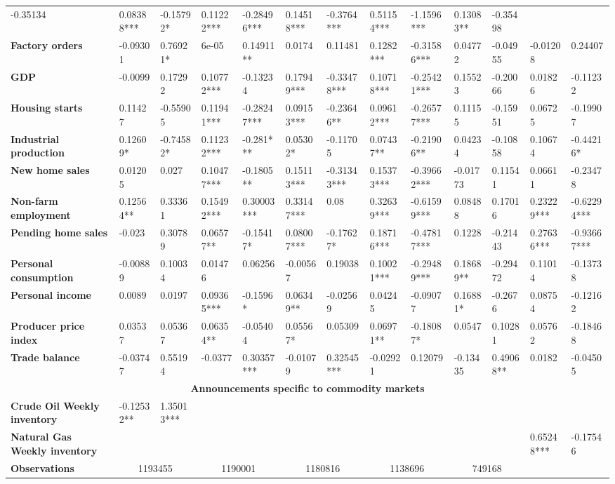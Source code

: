 \begin{sidewaystable}
{\begin{tabular}{@{}lllllllllllll@{}}
-0.35134 & 0.08388*** & -0.15792* & 0.11222*** & -0.28496*** & 0.14518*** & -0.3764*** & 0.51154*** & -1.1596*** & 0.13083** & -0.35498 \\ \textbf{Factory orders}& -0.09301 & 0.76921* & 6e-05 & 0.14911** & 0.0174 & 0.11481 & 0.1282*** & -0.31586*** & 0.04772 & -0.04955 & -0.01208 & 0.24407 \\ \textbf{GDP}& -0.0099 & 0.17292 & 0.10772*** & -0.13234 & 0.17949*** & -0.33478*** & 0.10718*** & -0.25421*** & 0.15523 & -0.20066 & 0.01826 & -0.11232 \\ \textbf{Housing starts}& 0.11427 & -0.55905 & 0.11941*** & -0.28247*** & 0.09153*** & -0.23646** & 0.09612*** & -0.26577*** & 0.11155 & -0.15951 & 0.06725 & -0.19907 \\ \textbf{Industrial production}& 0.12609* & -0.74582* & 0.11232*** & -0.281*** & 0.05302* & -0.11705 & 0.07437** & -0.21906** & 0.04234 & -0.10858 & 0.10674 & -0.44216* \\ \textbf{New home sales}& 0.01205 & 0.027 & 0.10477*** & -0.1805** & 0.15113*** & -0.31343*** & 0.15373*** & -0.39662*** & -0.01773 & 0.11541 & 0.06611 & -0.23478 \\ \textbf{Non-farm employment}& 0.12564** & 0.33361 & 0.15492*** & 0.30003*** & 0.33147*** & 0.08 & 0.32639*** & -0.61599*** & 0.08488 & 0.17016 & 0.23229*** & -0.62294*** \\ \textbf{Pending home sales}& -0.023 & 0.30789 & 0.06577** & -0.15417* & 0.08007*** & -0.17627* & 0.18716*** & -0.47817*** & 0.1228 & -0.21443 & 0.27636*** & -0.93667*** \\ \textbf{Personal consumption}& -0.00889 & 0.10034 & 0.01476 & 0.06256 & -0.00567 & 0.19038 & 0.10021*** & -0.29489*** & 0.18689** & -0.29472 & 0.11014 & -0.13738 \\ \textbf{Personal income}& 0.0089 & 0.0197 & 0.09365*** & -0.1596* & 0.06349** & -0.02569 & 0.04245 & -0.09077 & 0.16881* & -0.2676 & 0.08754 & -0.12162 \\ \textbf{Producer price index}& 0.03537 & 0.05367 & 0.06354** & -0.05404 & 0.05567* & 0.05309 & 0.06971** & -0.18087* & 0.0547 & 0.10281 & 0.05762 & -0.18468 \\ \textbf{Trade balance}& -0.03747 & 0.55194 & -0.0377 & 0.30357*** & -0.01079 & 0.32545*** & -0.02921 & 0.12079 & -0.13435 & 0.49068** & 0.0182 & -0.04505 \\  \midrule \multicolumn{13}{c}{\textbf{Announcements specific to commodity markets}} \\ \midrule \textbf{Crude Oil Weekly inventory}& -0.12532** & 1.35013*** &  &  &  &  &  &  &  &  &  &  \\ \textbf{Natural Gas Weekly inventory}&  &  &  &  &  &  &  &  &  &  & 0.65248*** & -0.17546 \\  \midrule \textbf{Observations}             &\multicolumn{2}{c}{ 1193455 }                                                 & \multicolumn{2}{c}{ 1190001 }                                                 & \multicolumn{2}{c}{ 1180816 }                                                 & \multicolumn{2}{c}{ 1138696 }                                                 & \multicolumn{2}{c}{ 749168 }                                  
\end{tabular}}
\end{sidewaystable}
